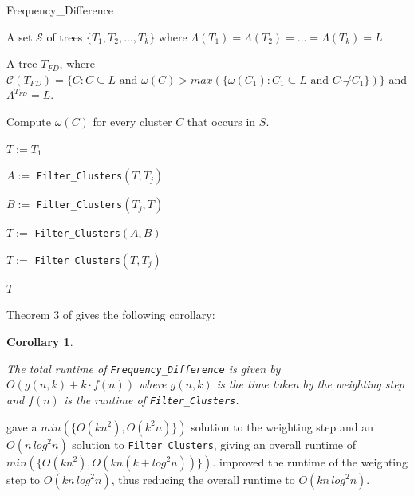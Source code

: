 \documentclass[12pt,a4paper]{article}
\newcommand{\compatible}{\smile}
\newcommand{\leafset}{\Lambda}
\newcommand{\weight}{\omega}
\newtheorem{freqdiffruntimecomponents}[incompatibility]{Corollary}
\begin{document}
    \begin{algorithm}
        \caption{Frequency\_Difference}
        \label{alg:frequencydifference}

        \begin{algorithmic}[1]
            \Input A set $\mathcal{S}$ of trees $\{T_1, T_2, ..., T_k\}$ where $\leafset(T_1) = \leafset(T_2) = ... = \leafset(T_k) = L$

            \Output A tree $T_{FD}$, where $\mathcal{C}(T_{FD}) = \{C : C \subseteq L \text{ and } \weight(C) > max(\{\weight(C_1) : C_1 \subseteq L \text{ and } C \not\compatible C_1\})\}$ and $\leafset^{T_{FD}} = L$.

            \State Compute $\weight(C)$ for every cluster $C$ that occurs in $S$.

            \State $T := T_1$

                \State $A :=$ \texttt{Filter\_Clusters}$(T, T_j)$

                \State $B :=$ \texttt{Filter\_Clusters}$(T_j, T)$

                \State $T :=$ \texttt{Filter\_Clusters}$(A, B)$
            \EndFor

                \State $T :=$ \texttt{Filter\_Clusters}$(T, T_j)$
            \EndFor

            \State \Return $T$
        \end{algorithmic}
    \end{algorithm}

    Theorem 3 of \cite{jansson2018algorithms} gives the following corollary:
    \newline

    \begin{freqdiffruntimecomponents}
        \label{cor:freqdiffruntimecomponents}

        The total runtime of \texttt{Frequency\_Difference} is given by $O(g(n, k) + k \cdot f(n))$ where $g(n, k)$ is the time taken by the weighting step and $f(n)$ is the runtime of \texttt{Filter\_Clusters}.
    \end{freqdiffruntimecomponents}

    \cite{jansson2018algorithms} gave a $min(\{O(kn^2), O(k^2n)\})$ solution to the weighting step and an $O(n\,log^2n)$ solution to \texttt{Filter\_Clusters}, giving an overall runtime of $min(\{O(kn^2), O(kn(k + log^2n))\})$. \cite{gawrychowski2017faster} improved the runtime of the weighting step to $O(kn\,log^2n)$, thus reducing the overall runtime to $O(kn\,log^2n)$.
\end{document}

